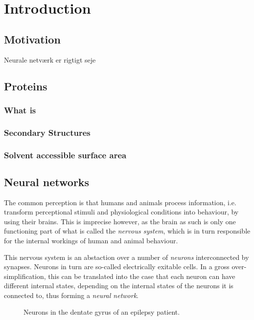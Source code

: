 \section{Introduction}
\subsection{Motivation}
Neurale netværk er rigtigt seje \cite{bishop2006}
\subsection{Proteins}
\subsubsection{What is}
\subsubsection{Secondary Structures}
\subsubsection{Solvent accessible surface area}
\subsection{Neural networks}
The common perception is that humans and animals process information, i.e. transform perceptional 
stimuli and physiological conditions into behaviour, by using their brains. This is imprecise 
however, as the brain as such is only one functioning part of what is called the \textit{nervous 
system}, which is in turn responsible for the internal workings of human and animal behaviour.

This nervous system is an abstaction over a number of \textit{neurons} interconnected by 
synapses. Neurons in turn are so-called electrically exitable cells. In a gross over-simplification, this can be translated into the case that each neuron can have different internal states, depending on the internal states of the neurons it is connected to, thus forming a \textit{neural network}.

\begin{figure}[h]
  \centering
  \caption{Neurons in the dentate gyrus of an epilepsy patient.}
\end{figure}

